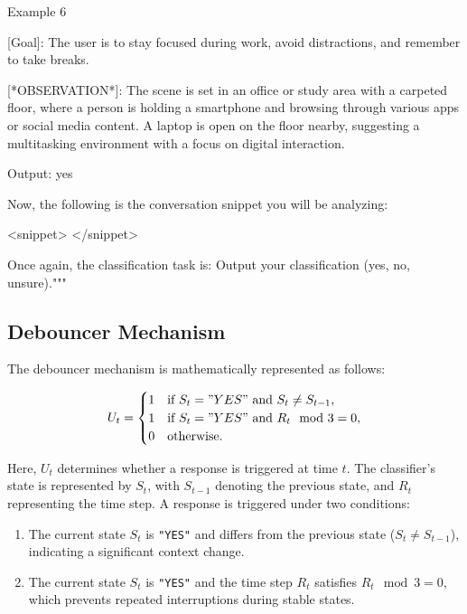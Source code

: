 Example 6

[Goal]: The user is to stay focused during work, avoid distractions, and remember to take breaks.

[*OBSERVATION*]: The scene is set in an office or study area with a carpeted floor, where a person is holding a smartphone and browsing through various apps or social media content. A laptop is open on the floor nearby, suggesting a multitasking environment with a focus on digital interaction.

Output: yes






Now, the following is the conversation snippet you will be analyzing:

<snippet>
</snippet>

Once again, the classification task is: 
Output your classification (yes, no, unsure)."""

\newpage
\subsection{Debouncer Mechanism}
\label{sec:debouncer}

The debouncer mechanism is mathematically represented as follows:

\[
U_t =
\begin{cases} 
1 & \text{if } S_t = "YES" \text{ and } S_t \neq S_{t-1}, \\
1 & \text{if } S_t = "YES" \text{ and } R_t \mod 3 = 0, \\
0 & \text{otherwise.}
\end{cases}
\]

Here, \( U_t \) determines whether a response is triggered at time \( t \). The classifier's state is represented by \( S_t \), with \( S_{t-1} \) denoting the previous state, and \( R_t \) representing the time step. A response is triggered under two conditions:
\begin{enumerate}
    \item The current state \( S_t \) is \texttt{"YES"} and differs from the previous state (\( S_t \neq S_{t-1} \)), indicating a significant context change.
    \item The current state \( S_t \) is \texttt{"YES"} and the time step \( R_t \) satisfies \( R_t \mod 3 = 0 \), which prevents repeated interruptions during stable states.
\end{enumerate}


